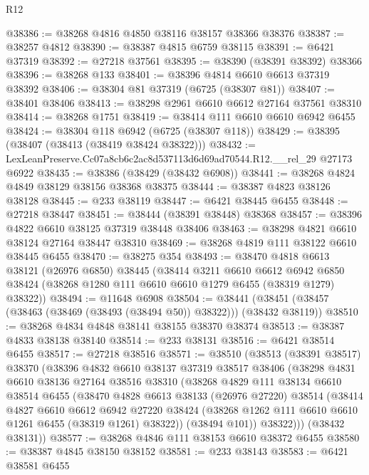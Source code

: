 \begin{lexlean}{R12}
\begin{coremodule}
@38386 := @38268 @4816 @4850 @38116 @38157 @38366 @38376
@38387 := @38257 @4812
@38390 := @38387 @4815 @6759 @38115
@38391 := @6421 @37319
@38392 := @27218 @37561
@38395 := @38390 (@38391 @38392) @38366
@38396 := @38268 @133
@38401 := @38396 @4814 @6610 @6613 @37319 @38392
@38406 := @38304 @81 @37319 (@6725 (@38307 @81))
@38407 := @38401 @38406
@38413 := @38298 @2961 @6610 @6612 @27164 @37561 @38310
@38414 := @38268 @1751
@38419 := @38414 @111 @6610 @6610 @6942 @6455
@38424 := @38304 @118 @6942 (@6725 (@38307 @118))
@38429 := @38395 (@38407 (@38413 (@38419 @38424 @38322)))
@38432 := LexLeanPreserve.Cc07a8cb6c2ac8d537113d6d69ad70544.R12.__rel_29 @27173 @6922
@38435 := @38386 (@38429 (@38432 @6908))
@38441 := @38268 @4824 @4849 @38129 @38156 @38368 @38375
@38444 := @38387 @4823 @38126 @38128
@38445 := @233 @38119
@38447 := @6421 @38445 @6455
@38448 := @27218 @38447
@38451 := @38444 (@38391 @38448) @38368
@38457 := @38396 @4822 @6610 @38125 @37319 @38448 @38406
@38463 := @38298 @4821 @6610 @38124 @27164 @38447 @38310
@38469 := @38268 @4819 @111 @38122 @6610 @38445 @6455
@38470 := @38275 @354
@38493 := @38470
    @4818
    @6613
    @38121
    (@26976 @6850)
    @38445
    (@38414
      @3211
      @6610
      @6612
      @6942
      @6850
      @38424
      (@38268 @1280 @111 @6610 @6610 @1279 @6455 (@38319 @1279) @38322))
@38494 := @11648 @6908
@38504 := @38441 (@38451 (@38457 (@38463 (@38469 (@38493 (@38494 @50)) @38322))) (@38432 @38119))
@38510 := @38268 @4834 @4848 @38141 @38155 @38370 @38374
@38513 := @38387 @4833 @38138 @38140
@38514 := @233 @38131
@38516 := @6421 @38514 @6455
@38517 := @27218 @38516
@38571 := @38510
    (@38513
      (@38391 @38517)
      @38370
      (@38396
        @4832
        @6610
        @38137
        @37319
        @38517
        @38406
        (@38298
          @4831
          @6610
          @38136
          @27164
          @38516
          @38310
          (@38268
            @4829
            @111
            @38134
            @6610
            @38514
            @6455
            (@38470
              @4828
              @6613
              @38133
              (@26976 @27220)
              @38514
              (@38414
                @4827
                @6610
                @6612
                @6942
                @27220
                @38424
                (@38268 @1262 @111 @6610 @6610 @1261 @6455 (@38319 @1261) @38322))
              (@38494 @101))
            @38322)))
      (@38432 @38131))
@38577 := @38268 @4846 @111 @38153 @6610 @38372 @6455
@38580 := @38387 @4845 @38150 @38152
@38581 := @233 @38143
@38583 := @6421 @38581 @6455

\end{coremodule}
\end{lexlean}
